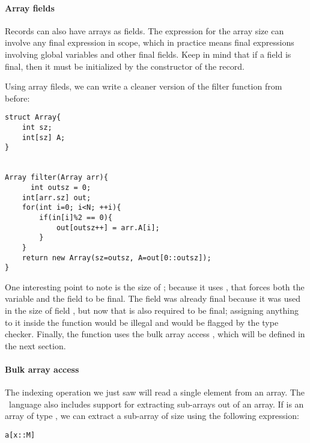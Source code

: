 \paragraph{Array fields}
Records can also have arrays as fields. The expression for the array size can involve any final expression in scope, which in practice means final expressions involving global variables and other final fields. Keep in mind that if a field is final, then it must be initialized by the constructor of the record. 

\begin{Example}
Using array fileds, we can write a cleaner version of the filter function from before:
\begin{lstlisting}
struct Array{
	int sz;
	int[sz] A;
}


Array filter(Array arr){
      int outsz = 0;
	int[arr.sz] out;
	for(int i=0; i<N; ++i){
		if(in[i]%2 == 0){
			out[outsz++] = arr.A[i];
		}
	}
	return new Array(sz=outsz, A=out[0::outsz]);
}
\end{lstlisting}
One interesting point to note is the size of ; because it uses , that forces both the variable  and the field  to be final. The field  was already final because it was used in the size of field , but now that  is also required to be final; assigning anything to it inside the function would be illegal and would be flagged by the type checker. Finally, the function uses the bulk array access , which will be defined in the next section.
\end{Example}







\paragraph{Bulk array access}
The indexing operation we just saw will read a single element from an array. The \SK\ language also includes support for extracting sub-arrays out of an array. If  is an array of type , we can extract a sub-array of size  using the following expression: 
\begin{lstlisting}
a[x::M]
\end{lstlisting}

